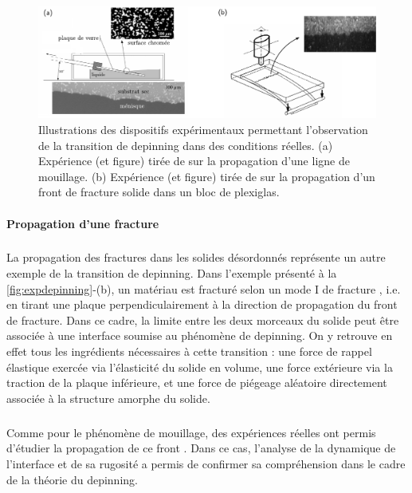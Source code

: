 \begin{figure}[h]
	\centering
	\includegraphics[width=\textwidth]{Chapitre1/Figures/Depinning/expdepinning.pdf}
	\caption{Illustrations des dispositifs expérimentaux permettant l'observation de la transition de depinning dans des conditions réelles. (a) Expérience (et figure) tirée de \cite{moulinet_roughness_2002} sur la propagation d'une ligne de mouillage. (b) Expérience (et figure) tirée de \cite{schmittbuhl_direct_1997} sur la propagation d'un front de fracture solide dans un bloc de plexiglas.}
	\label{fig:expdepinning}
\end{figure}

\paragraph{Propagation d'une fracture}

\subparagraph{}La propagation des fractures dans les solides désordonnés représente un autre exemple de la transition de depinning. Dans l'exemple présenté à la \autoref{fig:expdepinning}-(b), un matériau est fracturé selon un mode I de fracture \cite{le_priol_long_range_2020}, i.e. en tirant une plaque perpendiculairement à la direction de propagation du front de fracture. Dans ce cadre, la limite entre les deux morceaux du solide peut être associée à une interface soumise au phénomène de depinning. On y retrouve en effet tous les ingrédients nécessaires à cette transition : une force de rappel élastique exercée via l'élasticité du solide en volume, une force extérieure via la traction de la plaque inférieure, et une force de piégeage aléatoire directement associée à la structure amorphe du solide.

\subparagraph{}Comme pour le phénomène de mouillage, des expériences réelles ont permis d'étudier la propagation de ce front \cite{schmittbuhl_direct_1997, delaplace_high_1999, santucci_fracture_2010, le_priol_universal_2020}. Dans ce cas, l'analyse de la dynamique de l'interface et de sa rugosité a permis de confirmer sa compréhension dans le cadre de la théorie du depinning.

